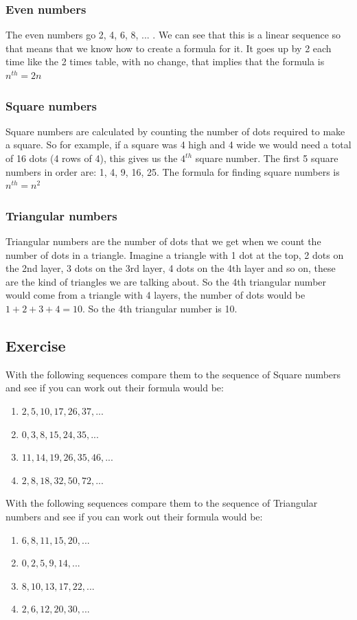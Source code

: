 \subsubsection{Even numbers}
The even numbers go 2, 4, 6, 8, ... . We can see that this is a linear sequence so that means that we know how to create a formula for it.  It goes up by 2 each time like the 2 times table, with no change, that implies that the formula is $n^{th}=2n$

\subsubsection{Square numbers}
Square numbers are calculated by counting the number of dots required to make a square.  So for example, if a square was 4 high and 4 wide we would need a total of 16 dots (4 rows of 4), this gives us the $4^{th}$ square number.  The first 5 square numbers in order are: 1, 4, 9, 16, 25.  The formula for finding square numbers is $n^{th}=n^2$

\subsubsection{Triangular numbers}
Triangular numbers are the number of dots that we get when we count the number of dots in a triangle.  Imagine a triangle with 1 dot at the top, 2 dots on the 2nd layer, 3 dots on the 3rd layer, 4 dots on the 4th layer and so on, these are the kind of triangles we are talking about.  So the 4th triangular number would come from a triangle with 4 layers, the number of dots would be $1+2+3+4=10$.  So the 4th triangular number is 10.

\subsection{Exercise}
With the following sequences compare them to the sequence of Square numbers and see if you can work out their formula would be:
\begin{enumerate}
	\item $2,5,10,17,26,37,...$
	\item $0,3,8,15,24,35,...$
	\item $11,14,19,26,35,46,...$
	\item $2,8,18,32,50,72,...$
\end{enumerate}
With the following sequences compare them to the sequence of Triangular numbers and see if you can work out their formula would be:
\begin{enumerate}
	\item $6,8,11,15,20,...$
	\item $0,2,5,9,14,...$
	\item $8,10,13,17,22,...$
	\item $2,6,12,20,30,...$
\end{enumerate}

